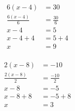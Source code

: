 \documentclass[12pt]{article}
\newcounter{minipagecount}
\begin{document}
\begin{multicols}{2}
\begin{minipage}[t]{0.45\textwidth}
    \begin{align*} %
        6(x - 4) &= 30\\
        \frac{6(x-4)}{6} &= \frac{30}{6}\\
        x - 4 &= 5\\
        x - 4 + 4 &= 5 + 4\\
        x &= 9\\
    \end{align*}
\end{minipage} %
\noindent{(\theminipagecount)}\hspace{0.1mm} %
\begin{minipage}[t]{0.45\textwidth} %
    \vspace{-26pt}  %
    \raggedright %
    \begin{align*} %
        2(x - 8) &= -10\\
        \frac{2(x-8)}{2} &= \frac{-10}{2}\\
        x - 8 &= -5\\
        x - 8 + 8 &= -5 + 8\\
        x &= 3\\
    \end{align*}
\end{minipage} %
\noindent{(\theminipagecount)}\hspace{0.1mm} %
\begin{minipage}[t]{0.45\textwidth} %
    \vspace{-26pt}  %

\end{minipage}
\end{multicols}
\end{document}
